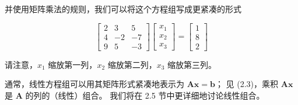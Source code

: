 并使用矩阵乘法的规则，我们可以将这个方程组写成更紧凑的形式

\begin{equation}
\begin{bmatrix} 2 & 3 & 5 \\ 4 & -2 & -7 \\ 9 & 5 & -3 \end{bmatrix} \begin{bmatrix} x_1 \\ x_2 \\ x_3 \end{bmatrix} = \begin{bmatrix} 1 \\ 8 \\ 2 \end{bmatrix}
\tag{2.36}\label{eq:2-36}
\end{equation}

请注意，$ x_1 $ 缩放第一列，$ x_2 $ 缩放第二列，$ x_3 $ 缩放第三列。

通常，线性方程组可以用其矩阵形式紧凑地表示为 $ \boldsymbol {Ax} = \boldsymbol{b} $； 见 (2.3)，乘积 $ \boldsymbol {Ax} $ 是 $ \boldsymbol{A} $ 的列的（线性）组合。 我们将在 2.5 节中更详细地讨论线性组合。
